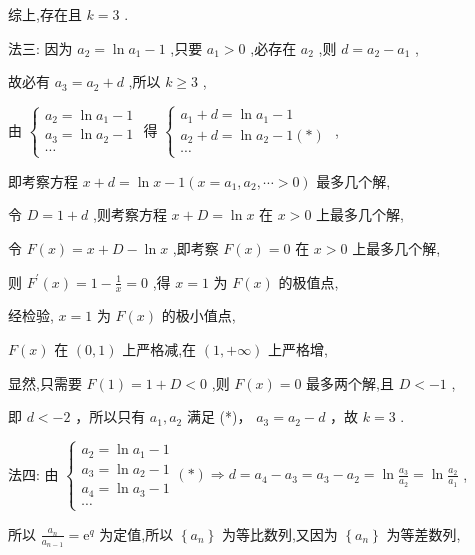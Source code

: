 \documentclass[10pt]{article}
\begin{document}
综上,存在且 \(k = 3\) .

法三: 因为 \({a}_{2} = \ln {a}_{1} - 1\) ,只要 \({a}_{1} > 0\) ,必存在 \({a}_{2}\) ,则 \(d = {a}_{2} - {a}_{1}\) ,

故必有 \({a}_{3} = {a}_{2} + d\) ,所以 \(k \geq  3\) ,

由 \(\left\{  \begin{array}{l} {a}_{2} = \ln {a}_{1} - 1 \\  {a}_{3} = \ln {a}_{2} - 1 \\  \cdots  \end{array}\right.\) 得 \(\left\{  \begin{array}{l} {a}_{1} + d = \ln {a}_{1} - 1 \\  {a}_{2} + d = \ln {a}_{2} - 1\left( *\right) \\  \cdots  \end{array}\right.\) ,

即考察方程 \(x + d = \ln x - 1\left( {x = {a}_{1},{a}_{2},\cdots  > 0}\right)\) 最多几个解,

令 \(D = 1 + d\) ,则考察方程 \(x + D = \ln x\) 在 \(x > 0\) 上最多几个解,

令 \(F\left( x\right)  = x + D - \ln x\) ,即考察 \(F\left( x\right)  = 0\) 在 \(x > 0\) 上最多几个解,

则 \({F}^{\prime }\left( x\right)  = 1 - \frac{1}{x} = 0\) ,得 \(x = 1\) 为 \(F\left( x\right)\) 的极值点,

经检验, \(x = 1\) 为 \(F\left( x\right)\) 的极小值点,

\(F\left( x\right)\) 在 \(\left( {0,1}\right)\) 上严格减,在 \(\left( {1, + \infty }\right)\) 上严格增,

显然,只需要 \(F\left( 1\right)  = 1 + D < 0\) ,则 \(F\left( x\right)  = 0\) 最多两个解,且 \(D <  - 1\) ,

即 \(d <  - 2\) ，所以只有 \({a}_{1},{a}_{2}\) 满足 (*)， \({a}_{3} = {a}_{2} - d\) ，故 \(k = 3\) .

法四: 由 \(\left\{  {\begin{array}{l} {a}_{2} = \ln {a}_{1} - 1 \\  {a}_{3} = \ln {a}_{2} - 1 \\  {a}_{4} = \ln {a}_{3} - 1 \\  \cdots  \end{array}\left( *\right)  \Rightarrow  d = {a}_{4} - {a}_{3} = {a}_{3} - {a}_{2} = \ln \frac{{a}_{3}}{{a}_{2}} = \ln \frac{{a}_{2}}{{a}_{1}}}\right.\) ,

所以 \(\frac{{a}_{n}}{{a}_{n - 1}} = {\mathrm{e}}^{q}\) 为定值,所以 \(\left\{  {a}_{n}\right\}\) 为等比数列,又因为 \(\left\{  {a}_{n}\right\}\) 为等差数列,
\end{document}
